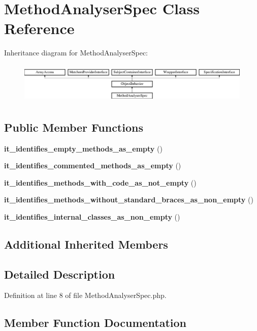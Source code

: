 \section{Method\+Analyser\+Spec Class Reference}
\label{classspec_1_1_php_spec_1_1_util_1_1_method_analyser_spec}
Inheritance diagram for Method\+Analyser\+Spec\+:\begin{figure}[H]
\begin{center}
\leavevmode
\includegraphics[height=1.953488cm]{classspec_1_1_php_spec_1_1_util_1_1_method_analyser_spec}
\end{center}
\end{figure}
\subsection*{Public Member Functions}
\begin{DoxyCompactItemize}
\item 
{\bf it\+\_\+identifies\+\_\+empty\+\_\+methods\+\_\+as\+\_\+empty} ()
\item 
{\bf it\+\_\+identifies\+\_\+commented\+\_\+methods\+\_\+as\+\_\+empty} ()
\item 
{\bf it\+\_\+identifies\+\_\+methods\+\_\+with\+\_\+code\+\_\+as\+\_\+not\+\_\+empty} ()
\item 
{\bf it\+\_\+identifies\+\_\+methods\+\_\+without\+\_\+standard\+\_\+braces\+\_\+as\+\_\+non\+\_\+empty} ()
\item 
{\bf it\+\_\+identifies\+\_\+internal\+\_\+classes\+\_\+as\+\_\+non\+\_\+empty} ()
\end{DoxyCompactItemize}
\subsection*{Additional Inherited Members}


\subsection{Detailed Description}


Definition at line 8 of file Method\+Analyser\+Spec.\+php.



\subsection{Member Function Documentation}
